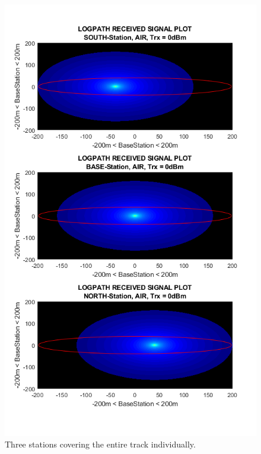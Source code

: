 \begin{figure}[h]
	\centering
	\includegraphics[width=\linewidth]{theory/pathLoss/fig/logpathReceivedSignal_eachStation_air_highSignal.png}
	\caption{Three stations covering the entire track individually.}
	\label{fig:logpathReceivedSignal_eachStation_air_highSignal}
\end{figure}

